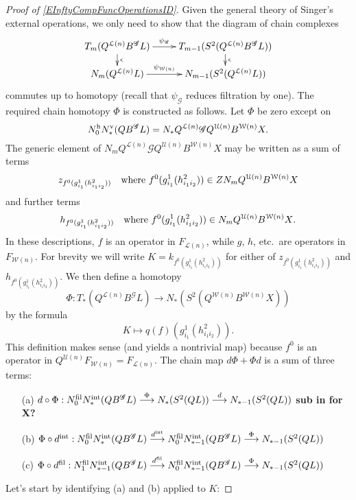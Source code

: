 \documentclass[11pt]{amsart}
\theoremstyle{plain}
\theoremstyle{definition}
\renewcommand{\to}{\longrightarrow}
\newcommand{\squishlist}{
  \setlength{\itemsep}{.5pt}
  \setlength{\parskip}{0pt}
  \setlength{\parsep}{0pt}}
\newcommand{\scrG}{\mathscr{G}}
\newcommand{\calW}{\mathcal{W}}
\newcommand{\calU}{\mathcal{U}}
\newcommand{\calL}{\mathcal{L}}
\theoremstyle{plain}
\newcommand{\BSW}{{\scrG}}
\newcommand{\BSWres}{B^\BSW}%
\begin{document}
\begin{Operations in composite functor spectral sequences}
\begin{proof}[Proof of \ref{EInftyCompFuncOperationsID}]
Given the general theory of Singer's external operations, we only need to show that the diagram of chain complexes
\[\xymatrix@R=4mm{
T_{m}(Q^{\calL(n)}\BSWres L)
\ar[r]^-{\psi_{\BSW}}
\ar[d]^-{\epsilon}
&%
T_{m-1}(S^2(Q^{\calL(n)}\BSWres L))\ar[d]^-{\epsilon}
\\%
N_{m}(Q^{\calL(n)}L)
\ar[r]^-{\psi_{\calW(n)}}
&%
N_{m-1}(S^2(Q^{\calL(n)} L))
}\]
commutes up to homotopy (recall that $\psi_{\BSW}$ reduces filtration by one). The required chain homotopy $\Phi$ is constructed as follows. Let $\Phi$ be zero except on 
\[N_0^\textup{h}N_*^\textup{v}(Q\BSWres L)=N_*Q^{\calL(n)}\BSW Q^{\calU(n)}B^{\calW(n)}X.\]
The generic element of $N_mQ^{\calL(n)}\BSW Q^{\calU(n)}B^{\calW(n)}X$ may be written as a sum of terms
\[z_{f^0(g^1_{i_1}(h^2_{i_1i_2}))}\textup{\quad where $f^0(g^1_{i_1}(h^2_{i_1i_2}))\in ZN_m Q^{\calU(n)}B^{\calW(n)}X$}\]
and further terms
\[h_{f^0(g^1_{i_1}(h^2_{i_1i_2}))}\textup{\quad where $f^0(g^1_{i_1}(h^2_{i_1i_2}))\in N_{m} Q^{\calU(n)}B^{\calW(n)}X$}.\]
In these descriptions, $f$ is an operator in $F_{\calL(n)}$, while $g$, $h$, etc.\ are operators in $F_{\calW(n)}$.
For brevity we will write $K=k_{f^0(g^1_{i_1}(h^2_{i_1i_2}))}$ for either of $z_{f^0(g^1_{i_1}(h^2_{i_1i_2}))}$ and $h_{f^0(g^1_{i_1}(h^2_{i_1i_2}))}$.
We then define a homotopy 
\[\Phi:T_*(Q^{\calL(n)}\BSWres L)\to N_*(S^2(Q^{\calW(n)}B^{\calW(n)}X))\]
by the formula
\[K\mapsto q(f)(g^1_{i_1}(h^2_{i_1i_2})).\]
This definition makes sense (and yields a nontrivial map) because $f^0$ is an operator in $Q^{\calU(n)}F_{\calW(n)}=F_{\calL(n)}$.
The chain map $d\Phi+\Phi d$ is a sum of three terms:
\begin{enumerate}\squishlist
\setlength{\parindent}{.25in}
\item[(a)] $d\circ\Phi:N_0^\textup{fil}N_*^\textup{int}(Q\BSWres L)\overset{\Phi}{\to} N_*(S^2(QL))\overset{d}{\to} N_{*-1}(S^2(QL))$ \textbf{sub in for X?}
\item[(b)] $\Phi\circ d^\textup{int}:N_0^\textup{fil}N_{*}^\textup{int}(Q\BSWres L)\overset{d^\textup{int}}{\to} N_0^\textup{fil}N_{*-1}^\textup{int}(Q\BSWres L)\overset{\Phi}{\to} N_{*-1}(S^2(QL))$
\item[(c)] $\Phi\circ d^\textup{fil}:N_1^\textup{fil}N_{*-1}^\textup{int}(Q\BSWres L)\overset{d^\textup{fil}}{\to} N_0^\textup{fil}N_{*-1}^\textup{int}(Q\BSWres L)\overset{\Phi}{\to} N_{*-1}(S^2(QL))$
\end{enumerate}
Let's start by identifying (a) and (b) applied to $K$:

\end{proof}
\end{Operations in composite functor spectral sequences}
\end{document}
